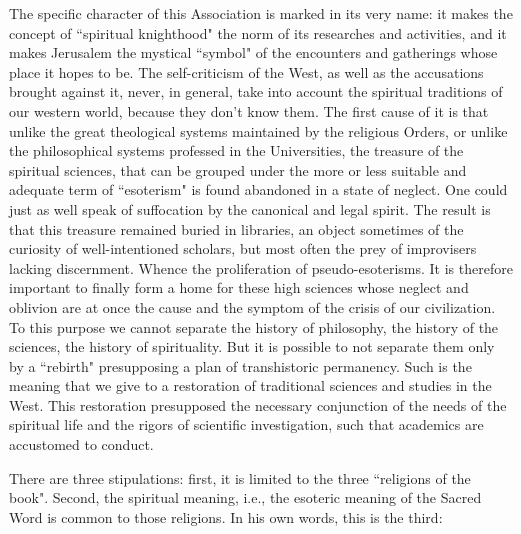\begin{quotex}
The specific character of this Association is marked in its very name: it makes the concept of ``spiritual knighthood" the norm of its researches and activities, and it makes Jerusalem the mystical ``symbol" of the encounters and gatherings whose place it hopes to be. The self-criticism of the West, as well as the accusations brought against it, never, in general, take into account the spiritual traditions of our western world, because they don't know them. The first cause of it is that unlike the great theological systems maintained by the religious Orders, or unlike the philosophical systems professed in the Universities, the treasure of the spiritual sciences, that can be grouped under the more or less suitable and adequate term of ``esoterism" is found abandoned in a state of neglect. One could just as well speak of suffocation by the canonical and legal spirit. The result is that this treasure remained buried in libraries, an object sometimes of the curiosity of well-intentioned scholars, but most often the prey of improvisers lacking discernment. Whence the proliferation of pseudo-esoterisms. It is therefore important to finally form a home for these high sciences whose neglect and oblivion are at once the cause and the symptom of the crisis of our civilization. To this purpose we cannot separate the history of philosophy, the history of the sciences, the history of spirituality. But it is possible to not separate them only by a ``rebirth" presupposing a plan of transhistoric permanency. Such is the meaning that we give to a restoration of traditional sciences and studies in the West. This restoration presupposed the necessary conjunction of the needs of the spiritual life and the rigors of scientific investigation, such that academics are accustomed to conduct. 

\end{quotex}
There are three stipulations: first, it is limited to the three ``religions of the book". Second, the spiritual meaning, i.e., the esoteric meaning of the Sacred Word is common to those religions. In his own words, this is the third:

